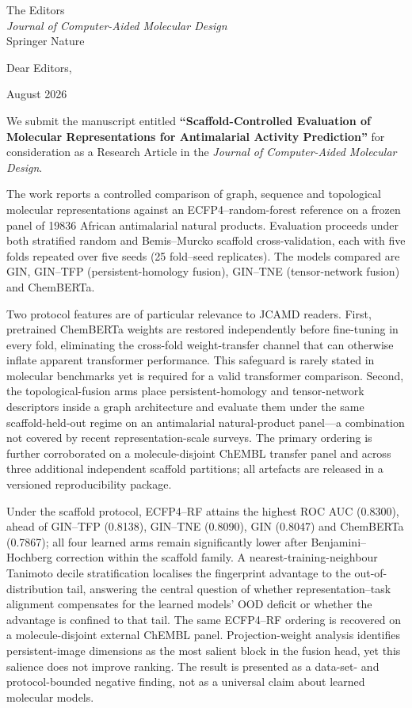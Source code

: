 \documentclass[11pt,a4paper]{letter}
\begin{document}
\begin{letter}{%
  The Editors \\
  \textit{Journal of Computer-Aided Molecular Design} \\
  Springer Nature
}

\opening{Dear Editors,}

 August 2026

We submit the manuscript entitled \textbf{``Scaffold-Controlled Evaluation of Molecular Representations for Antimalarial Activity Prediction''} for consideration as a Research Article in the \textit{Journal of Computer-Aided Molecular Design}.

The work reports a controlled comparison of graph, sequence and topological molecular representations against an ECFP4--random-forest reference on a frozen panel of \num{19836} African antimalarial natural products. Evaluation proceeds under both stratified random and Bemis--Murcko scaffold cross-validation, each with five folds repeated over five seeds (\num{25} fold--seed replicates). The models compared are GIN, GIN--TFP (persistent-homology fusion), GIN--TNE (tensor-network fusion) and ChemBERTa.

Two protocol features are of particular relevance to JCAMD readers. First, pretrained ChemBERTa weights are restored independently before fine-tuning in every fold, eliminating the cross-fold weight-transfer channel that can otherwise inflate apparent transformer performance. This safeguard is rarely stated in molecular benchmarks yet is required for a valid transformer comparison. Second, the topological-fusion arms place persistent-homology and tensor-network descriptors inside a graph architecture and evaluate them under the same scaffold-held-out regime on an antimalarial natural-product panel---a combination not covered by recent representation-scale surveys. The primary ordering is further corroborated on a molecule-disjoint ChEMBL transfer panel and across three additional independent scaffold partitions; all artefacts are released in a versioned reproducibility package.

Under the scaffold protocol, ECFP4--RF attains the highest ROC AUC (\num{0.8300}), ahead of GIN--TFP (\num{0.8138}), GIN--TNE (\num{0.8090}), GIN (\num{0.8047}) and ChemBERTa (\num{0.7867}); all four learned arms remain significantly lower after Benjamini--Hochberg correction within the scaffold family. A nearest-training-neighbour Tanimoto decile stratification localises the fingerprint advantage to the out-of-distribution tail, answering the central question of whether representation--task alignment compensates for the learned models' OOD deficit or whether the advantage is confined to that tail. The same ECFP4--RF ordering is recovered on a molecule-disjoint external ChEMBL panel. Projection-weight analysis identifies persistent-image dimensions as the most salient block in the fusion head, yet this salience does not improve ranking. The result is presented as a data-set- and protocol-bounded negative finding, not as a universal claim about learned molecular models.


\end{letter}
\end{document}
